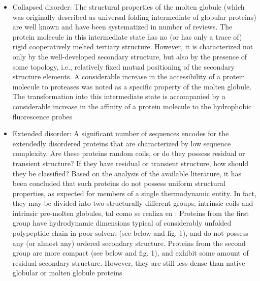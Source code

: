\begin{itemize}
 \item Collapsed disorder:  The structural properties of the molten globule (which was originally described as universal folding intermediate of globular proteins) are well known and
have been systematized in number of reviews. The protein molecule in this intermediate state has no (or has only a trace of) rigid cooperatively melted tertiary structure. 
However, it is characterized not only by the well-developed secondary structure, but also by the presence of some topology, i.e., relatively fixed mutual positioning of the secondary structure elements.
A considerable increase in the accessibility of a protein molecule to proteases was noted as a specific property of the molten globule.
The transformation into this intermediate state is accompanied by a considerable increase in the affinity of a protein molecule to the hydrophobic fluorescence probes

 \item Extended disorder: A significant number of sequences encodes for the extendedly disordered proteins that are characterized by low sequence complexity. Are these proteins
random coils, or do they possess residual or transient structure? If they have residual or transient structure, how should they be classified? Based on the analysis of the available literature, it has been concluded that such proteins do not possess uniform structural properties, as expected for members of a single thermodynamic entity.
In fact, they may be divided into two structurally different groups, intrinsic coils and intrinsic pre-molten globules, tal como se realiza en \cite{uversky2002natively}: 
 Proteins from the first group have hydrodynamic dimensions typical of considerably unfolded polypeptide chain in poor solvent (see below and fig. 1), and do not possess any (or almost any) ordered secondary structure. 
Proteins from the second group are more compact (see below and fig. 1), and exhibit some amount of residual secondary structure. However, they are still less dense than native globular or molten globule proteins
\end{itemize}





















